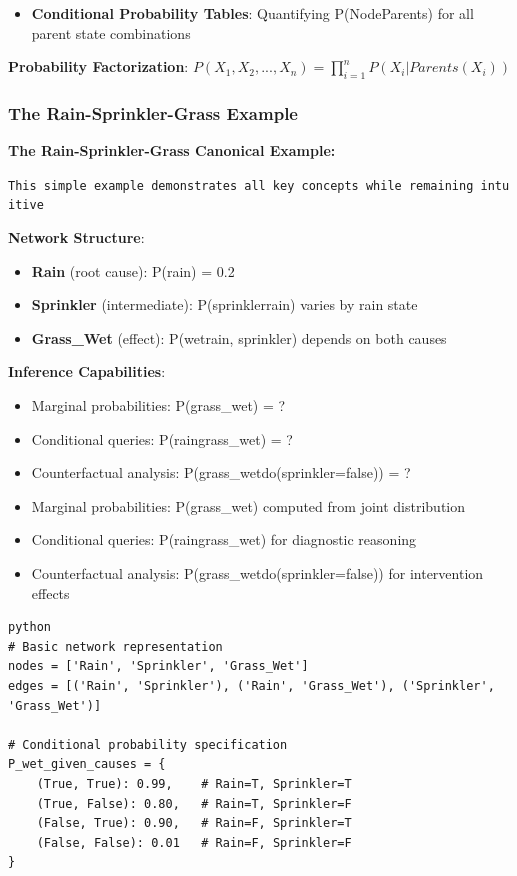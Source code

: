 \documentclass[
  11pt,
  letterpaper,
]{book}
\providecommand{\tightlist}{%
  \setlength{\itemsep}{0pt}\setlength{\parskip}{0pt}}
\begin{document}
\begin{itemize}
\tightlist
\item
  \textbf{Conditional Probability Tables}: Quantifying
  P(Node\textbar Parents) for all parent state combinations
\end{itemize}

\textbf{Probability Factorization}:
\(P(X_1, X_2, ..., X_n) = \prod_{i=1}^{n} P(X_i | Parents(X_i))\)

\subsubsection{The Rain-Sprinkler-Grass
Example}\label{sec-rain-sprinkler-example}

\textbf{The Rain-Sprinkler-Grass Canonical Example:}

\texttt{This\ simple\ example\ demonstrates\ all\ key\ concepts\ while\ remaining\ intuitive}

\textbf{Network Structure}:

\begin{itemize}
\tightlist
\item
  \textbf{Rain} (root cause): P(rain) = 0.2
\item
  \textbf{Sprinkler} (intermediate): P(sprinkler\textbar rain) varies by
  rain state
\item
  \textbf{Grass\_Wet} (effect): P(wet\textbar rain, sprinkler) depends
  on both causes
\end{itemize}

\textbf{Inference Capabilities}:

\begin{itemize}
\item
  Marginal probabilities: P(grass\_wet) = ?
\item
  Conditional queries: P(rain\textbar grass\_wet) = ?
\item
  Counterfactual analysis: P(grass\_wet\textbar do(sprinkler=false)) = ?
\item
  Marginal probabilities: P(grass\_wet) computed from joint distribution
\item
  Conditional queries: P(rain\textbar grass\_wet) for diagnostic
  reasoning
\item
  Counterfactual analysis: P(grass\_wet\textbar do(sprinkler=false)) for
  intervention effects
\end{itemize}

\begin{verbatim}
python
# Basic network representation
nodes = ['Rain', 'Sprinkler', 'Grass_Wet']
edges = [('Rain', 'Sprinkler'), ('Rain', 'Grass_Wet'), ('Sprinkler', 'Grass_Wet')]

# Conditional probability specification
P_wet_given_causes = {
    (True, True): 0.99,    # Rain=T, Sprinkler=T
    (True, False): 0.80,   # Rain=T, Sprinkler=F  
    (False, True): 0.90,   # Rain=F, Sprinkler=T
    (False, False): 0.01   # Rain=F, Sprinkler=F
}
\end{verbatim}
\end{document}
